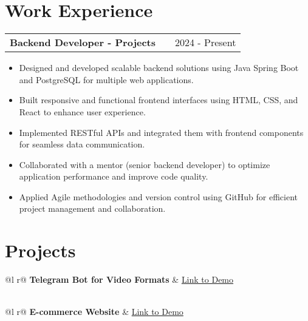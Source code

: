 \documentclass[a4paper,12pt]{article}
\makeatletter
\newenvironment{joblong}[2]
    {
    \begin{tabularx}{\linewidth}{@{}l X r@{}}
    \textbf{#1} & \hfill &  #2 \\[3.75pt]
    \end{tabularx}
    \begin{minipage}[t]{\linewidth}
    \begin{itemize}[nosep,after=\strut, leftmargin=1em, itemsep=3pt,label=--]
    }
    {
    \end{itemize}
    \end{minipage}    
    }
\makeatother
\begin{document}
\section{Work Experience}

\begin{joblong}{Backend Developer - Projects}{2024 - Present}
\item Designed and developed scalable backend solutions using Java Spring Boot and PostgreSQL for multiple web applications.
\item Built responsive and functional frontend interfaces using HTML, CSS, and React to enhance user experience.
\item Implemented RESTful APIs and integrated them with frontend components for seamless data communication.
\item Collaborated with a mentor (senior backend developer) to optimize application performance and improve code quality.
\item Applied Agile methodologies and version control using GitHub for efficient project management and collaboration.
\end{joblong}
  
\section{Projects}

\begin{tabularx}{\linewidth}{ @{}l r@{} }
\textbf{Telegram Bot for Video Formats} & \hfill \href{https://github.com/YOUR_GITHUB/BOT_PROJECT}{Link to Demo} \\[3.75pt]
  \\
\end{tabularx}

\begin{tabularx}{\linewidth}{ @{}l r@{} }
\textbf{E-commerce Website} & \hfill \href{https://github.com/YOUR_GITHUB/ECOMMERCE_PROJECT}{Link to Demo} \\[3.75pt]
  \\
\end{tabularx}

\end{document}
